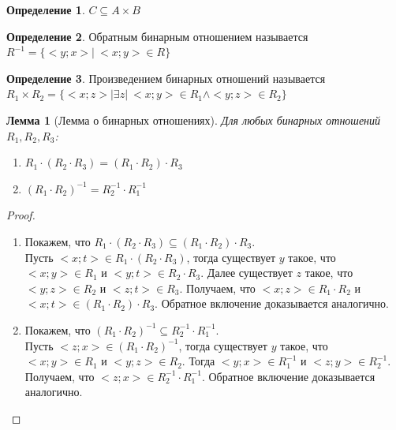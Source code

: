 \documentclass[a4paper]{article}
\newtheorem*{lemma*}{Лемма}
\theoremstyle{definition}
\newtheorem*{definition*}{Определение}
\begin{document}
\begin{enumerate}
\begin{definition*}
        $C \subseteq{A \times B}$
       \end{definition*}
       \begin{definition*}Обратным бинарным отношением называется \\
        $R^{-1} = \{<y;x> |\ <x;y> \in{R}\}$
       \end{definition*}
       \begin{definition*}Произведением бинарных отношений называется \\
        $R_{1}\times R_{2} = \{<x;z>          |\exists z |\ <x;y> \in R_{1}   \land <y;z> \in R_{2}\}$
       \end{definition*}
       \begin{lemma*}[Лемма о бинарных отношениях]
        Для любых бинарных отношений $R_{1},R_{2},R_{3} $:
        \begin{enumerate}
         \item     $R_{1}\cdot (R_{2}\cdot R_{3}) = (R_{1}\cdot R_{2})\cdot R_{3} $\\
         \item $(R_{1}\cdot R_{2})^{-1} = R_{2}^{-1}\cdot R_{1}^{-1} $
        \end{enumerate}
       \end{lemma*}
       \begin{proof}
        \begin{enumerate}
         \item Покажем, что $R_{1}\cdot (R_{2}\cdot R_{3}) \subseteq (R_{1}\cdot R_{2})\cdot R_{3} $. \\
               Пусть $<x;t> \in R_{1}\cdot (R_{2}\cdot R_{3})$, тогда существует $y$ такое, что \\ $<x;y>\in R_{1}$ и $<y;t>\in R_{2}\cdot R_{3}$. Далее существует $z$ такое, что  $<y;z>\in R_{2}$ и  $<z;t>\in R_{3}$. Получаем, что $<x;z>\in R_{1}\cdot R_{2}$ и $<x;t>\in (R_{1}\cdot R_{2})\cdot R_{3}$.
               Обратное включение доказывается аналогично.
         \item Покажем, что $(R_{1}\cdot R_{2})^{-1} \subseteq R_{2}^{-1}\cdot R_{1}^{-1} $.\\
               Пусть $<z;x> \in (R_{1}\cdot R_{2})^{-1}$, тогда существует $y$ такое, что $<x;y>\in R_{1}$ и $<y;z>\in R_{2}$. Тогда $<y;x>\in R_{1}^{-1}$ и
               $<z;y>\in R_{2}^{-1}$.
               Получаем, что $<z;x> \in R_{2}^{-1}\cdot R_{1}^{-1} $.
               Обратное включение доказывается аналогично.
        \end{enumerate}
       \end{proof}

\end{enumerate}
\end{document}
